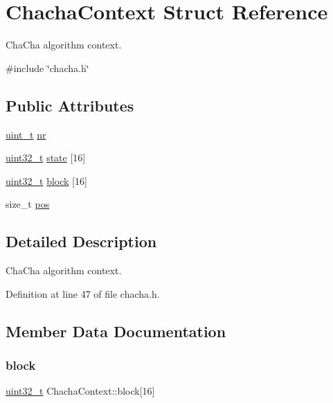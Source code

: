 \hypertarget{structChachaContext}{}\section{Chacha\+Context Struct Reference}
\label{structChachaContext}


Cha\+Cha algorithm context.  




{\ttfamily \#include \char`\"{}chacha.\+h\char`\"{}}

\subsection*{Public Attributes}
\begin{DoxyCompactItemize}
\item 
\hyperlink{compiler__port_8h_a12a1e9b3ce141648783a82445d02b58d}{uint\+\_\+t} \hyperlink{structChachaContext_a090120c0379bab4a191d22b52d1cc679}{nr}
\item 
\hyperlink{stdint_8h_a435d1572bf3f880d55459d9805097f62}{uint32\+\_\+t} \hyperlink{structChachaContext_a0930b5fb8738edf5d43a5c21a8d4bc33}{state} \mbox{[}16\mbox{]}
\item 
\hyperlink{stdint_8h_a435d1572bf3f880d55459d9805097f62}{uint32\+\_\+t} \hyperlink{structChachaContext_a67570a5ca55f05634715e5da02be2f0e}{block} \mbox{[}16\mbox{]}
\item 
size\+\_\+t \hyperlink{structChachaContext_aa5c55f8bef7d138c7403440d421ef98a}{pos}
\end{DoxyCompactItemize}


\subsection{Detailed Description}
Cha\+Cha algorithm context. 

Definition at line 47 of file chacha.\+h.



\subsection{Member Data Documentation}
\mbox{\label{structChachaContext_a67570a5ca55f05634715e5da02be2f0e}} 
\subsubsection{\texorpdfstring{block}{block}}
{\footnotesize\ttfamily \hyperlink{stdint_8h_a435d1572bf3f880d55459d9805097f62}{uint32\+\_\+t} Chacha\+Context\+::block\mbox{[}16\mbox{]}}



